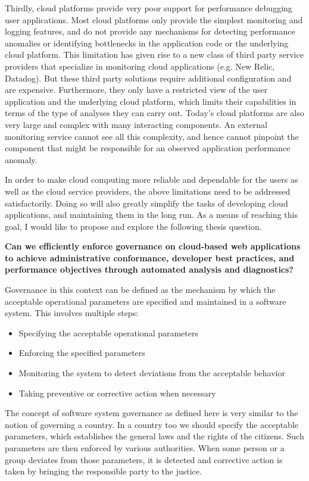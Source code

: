 Thirdly, cloud platforms provide very poor support for performance debugging
user applications. Most cloud platforms only provide the simplest monitoring and logging features,
and do not provide any mechanisms for detecting performance anomalies or identifying
bottlenecks in the application code or the underlying cloud platform. This limitation has given rise
to a new class of third party service providers that specialize in monitoring cloud applications
(e.g. New Relic, Datadog). But these third party solutions require additional configuration 
and are expensive.
Furthermore, they only have a restricted view of the user application and the underlying
cloud platform, which limits their capabilities in terms of the type of analyses they can carry out.
Today's cloud platforms are also very large and complex with many interacting components.
An external monitoring service cannot see all this complexity, and hence cannot pinpoint
the component that might be responsible for an observed application performance anomaly.

In order to make cloud computing more reliable and dependable for the users as well
as the cloud service providers, the above limitations need to be addressed satisfactorily.
Doing so will also greatly simplify the tasks of developing cloud applications, and maintaining 
them in the long run. As a means of reaching this goal, I would like to propose and explore the
following thesis question.

{\bf Can we efficiently enforce governance on cloud-based web applications to achieve 
administrative conformance, developer best practices, and performance objectives through 
automated analysis and diagnostics?} 

Governance in this context can be defined as the mechanism by which the acceptable 
operational parameters are specified and maintained in a software system. This involves 
multiple steps:
\begin{itemize}
\item Specifying the acceptable operational parameters
\item Enforcing the specified parameters
\item Monitoring the system to detect deviations from the acceptable behavior
\item Taking preventive or corrective action when necessary
\end{itemize}

The concept of software system governance as defined here is very similar to the
notion of governing a country. In a country too we should specify the acceptable
parameters, which establishes the general laws and the rights of the citizens. Such 
parameters are then
enforced by various authorities. When some person or a group deviates from those parameters,
it is detected and corrective action is taken by bringing the responsible party to the justice.

